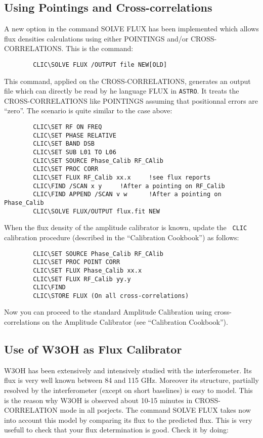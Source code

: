 \documentclass[11pt]{article}
\begin{document}
\subsection{Using Pointings and Cross-correlations}

A new option in the command SOLVE FLUX has been implemented which allows
flux densities calculations using either POINTINGS and/or
CROSS-CORRELATIONS.  This is the command:
\begin{verbatim}
        CLIC\SOLVE FLUX /OUTPUT file NEW[OLD]
\end{verbatim}
This command, applied on the CROSS-CORRELATIONS, generates an output file
which can directly be read by he language FLUX in {\tt ASTRO}. It treats
the CROSS-CORRELATIONS like POINTINGS assuming that positionnal errors are
``zero''. The scenario is quite similar to the case above:

\begin{verbatim}
        CLIC\SET RF ON FREQ
        CLIC\SET PHASE RELATIVE
        CLIC\SET BAND DSB
        CLIC\SET SUB L01 TO L06
        CLIC\SET SOURCE Phase_Calib RF_CAlib
        CLIC\SET PROC CORR
        CLIC\SET FLUX RF_Calib xx.x     !see flux reports
        CLIC\FIND /SCAN x y     !After a pointing on RF_Calib
        CLIC\FIND APPEND /SCAN v w      !After a pointing on Phase_Calib
        CLIC\SOLVE FLUX/OUTPUT flux.fit NEW 
\end{verbatim}

When the flux density of the amplitude calibrator is known, update the {\tt
  CLIC} calibration procedure (described in the ``Calibration Cookbook'')
as follows:

\begin{verbatim}
        CLIC\SET SOURCE Phase_Calib RF_CAlib
        CLIC\SET PROC POINT CORR
        CLIC\SET FLUX Phase_Calib xx.x
        CLIC\SET FLUX RF_Calib yy.y
        CLIC\FIND 
        CLIC\STORE FLUX (On all cross-correlations) 
\end{verbatim} 
 
Now you can proceed to the standard Amplitude Calibration using
cross-correlations on the Amplitude Calibrator (see ``Calibration
Cookbook'').

\subsection{Use of W3OH as Flux Calibrator}

W3OH has been extensively and intensively studied with the interferometer.
Its flux is very well known between 84 and 115 GHz. Moreover its structure,
partially resolved by the interferometer (except on short baselines) is
easy to model. This is the reason why W3OH is observed about 10-15 minutes
in CROSS-CORRELATION mode in all porjects. The command SOLVE FLUX takes now
into account this model by comparing its flux to the predicted flux.  This
is very usefull to check that your flux determination is good.  Check it by
doing:
 
\end{document}
